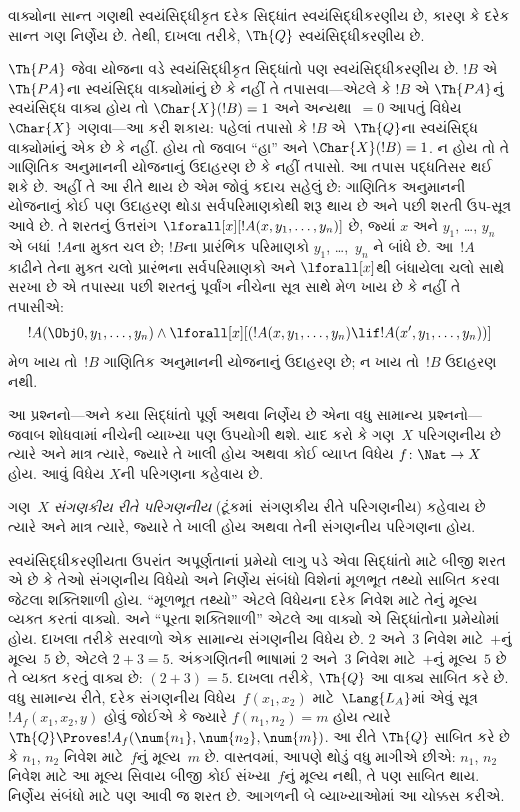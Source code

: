\begin{ex}
વાક્યોના સાન્ત ગણથી સ્વયંસિદ્ધીકૃત
દરેક સિદ્ધાંત સ્વયંસિદ્ધીકરણીય છે, કારણ કે
દરેક સાન્ત ગણ નિર્ણેય છે. તેથી,
દાખલા તરીકે, $\Th{Q}$ સ્વયંસિદ્ધીકરણીય છે.

$\Th{PA}$ જેવા યોજના વડે સ્વયંસિદ્ધીકૃત
સિદ્ધાંતો પણ સ્વયંસિદ્ધીકરણીય છે. $!B$ એ
$\Th{PA}$ના સ્વયંસિદ્ધ વાક્યોમાંનું છે કે
નહીં તે તપાસવા—એટલે કે $!B$ એ
$\Th{PA}$નું સ્વયંસિદ્ધ વાક્ય હોય તો
$\Char{X}(!B)=1$ અને અન્યથા~$=0$
આપતું વિધેય~$\Char{X}$ ગણવા—આ કરી શકાય:
પહેલાં તપાસો કે $!B$ એ~$\Th{Q}$ના
સ્વયંસિદ્ધ વાક્યોમાંનું એક છે કે નહીં.
હોય તો જવાબ ``હા'' અને
$\Char{X}(!B)=1$. ન હોય તો તે ગાણિતિક અનુમાનની
યોજનાનું ઉદાહરણ છે કે નહીં તપાસો. આ
તપાસ પદ્ધતિસર થઈ શકે છે. અહીં તે આ રીતે
થાય છે એમ જોવું કદાચ સહેલું છે: ગાણિતિક અનુમાનની
યોજનાનું કોઈ પણ ઉદાહરણ થોડા સર્વપરિમાણકોથી
શરૂ થાય છે અને પછી શરતી ઉપ-સૂત્ર
આવે છે. તે શરતનું ઉત્તરાંગ
$\lforall[x][!A(x, y_1, \dots, y_n)]$
છે, જ્યાં $x$ અને $y_1$, \dots, $y_n$
એ બધાં~$!A$ના મુક્ત ચલ છે; $!B$ના
પ્રારંભિક પરિમાણકો $y_1$, \dots,~$y_n$
ને બાંધે છે. આ~$!A$ કાઢીને તેના મુક્ત
ચલો પ્રારંભના સર્વપરિમાણકો અને
$\lforall[x]$થી બંધાયેલા ચલો સાથે સરખા
છે એ તપાસ્યા પછી શરતનું પૂર્વાંગ
નીચેના સૂત્ર સાથે મેળ ખાય છે કે નહીં
તે તપાસીએ:
\[
!A(\Obj 0, y_1, \dots, y_n) \land \lforall[x][(!A(x, y_1, \dots, y_n)
\lif !A(x', y_1, \dots, y_n))]
\]
મેળ ખાય તો~$!B$ ગાણિતિક અનુમાનની યોજનાનું
ઉદાહરણ છે; ન ખાય તો~$!B$ ઉદાહરણ નથી.
\end{ex}

આ પ્રશ્નનો—અને કયા સિદ્ધાંતો પૂર્ણ અથવા
નિર્ણેય છે એના વધુ સામાન્ય પ્રશ્નનો—જવાબ
શોધવામાં નીચેની વ્યાખ્યા પણ ઉપયોગી થશે.
યાદ કરો કે ગણ~$X$ પરિગણનીય છે ત્યારે
અને માત્ર ત્યારે, જ્યારે તે ખાલી હોય અથવા
કોઈ વ્યાપ્ત વિધેય
$f \colon \Nat \to X$ હોય. આવું વિધેય
$X$ની પરિગણના કહેવાય છે.

\begin{defn}
ગણ~$X$ \emph{સંગણકીય રીતે પરિગણનીય}
(ટૂંકમાં~સંગણકીય રીતે પરિગણનીય) કહેવાય છે ત્યારે અને માત્ર
ત્યારે, જ્યારે તે ખાલી હોય અથવા તેની
સંગણનીય પરિગણના હોય.
\end{defn}

સ્વયંસિદ્ધીકરણીયતા ઉપરાંત અપૂર્ણતાનાં
પ્રમેયો લાગુ પડે એવા સિદ્ધાંતો માટે બીજી શરત
એ છે કે તેઓ સંગણનીય વિધેયો અને
નિર્ણેય સંબંધો વિશેનાં મૂળભૂત તથ્યો
સાબિત કરવા જેટલા શક્તિશાળી હોય. ``મૂળભૂત
તથ્યો'' એટલે વિધેયના દરેક નિવેશ માટે તેનું
મૂલ્ય વ્યક્ત કરતાં વાક્યો. અને
``પૂરતા શક્તિશાળી'' એટલે આ વાક્યો એ
સિદ્ધાંતોના પ્રમેયોમાં હોય. દાખલા તરીકે
સરવાળો એક સામાન્ય સંગણનીય વિધેય છે.
$2$ અને~$3$ નિવેશ માટે~$+$નું મૂલ્ય~$5$
છે, એટલે $2+3=5$. અંકગણિતની ભાષામાં
$2$ અને~$3$ નિવેશ માટે~$+$નું મૂલ્ય~$5$
છે તે વ્યક્ત કરતું વાક્ય છે:
$(\num{2} + \num{3}) = \num{5}$.
દાખલા તરીકે, $\Th{Q}$ આ વાક્ય સાબિત
કરે છે. વધુ સામાન્ય રીતે, દરેક સંગણનીય
વિધેય~$f(x_1, x_2)$ માટે~$\Lang{L_A}$માં
એવું સૂત્ર~$!A_f(x_1, x_2, y)$
હોવું જોઈએ કે જ્યારે $f(n_1, n_2)=m$
હોય ત્યારે $\Th{Q} \Proves
!A_f(\num{n_1}, \num{n_2}, \num{m})$.
આ રીતે $\Th{Q}$ સાબિત કરે છે કે
$n_1$, $n_2$ નિવેશ માટે~$f$નું મૂલ્ય~$m$
છે. વાસ્તવમાં, આપણે થોડું વધુ માગીએ છીએ:
$n_1$, $n_2$ નિવેશ માટે આ મૂલ્ય સિવાય
બીજી કોઈ સંખ્યા~$f$નું મૂલ્ય નથી, તે પણ
સાબિત થાય.
નિર્ણેય સંબંધો માટે પણ આવી જ શરત
છે. આગળની બે વ્યાખ્યાઓમાં આ ચોક્કસ કરીએ.

